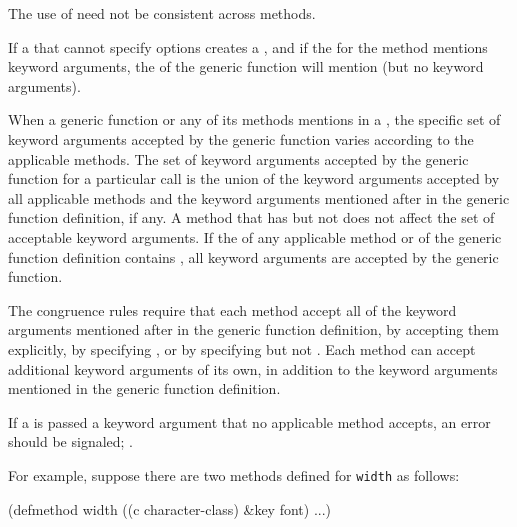  The use of  need not be consistent across methods.

If a  that cannot specify  options
creates a , and if the  for the method
mentions keyword arguments, the  of the generic function
will mention  (but no keyword arguments).

\endlist

\endSubsection%


                                                        
When a generic function or any of its methods mentions 
 in a , the specific set of keyword
arguments accepted by the generic function varies according to the
applicable methods.  The set of keyword arguments accepted by the
generic function for a particular call is the union of the keyword
arguments accepted by all applicable methods and the keyword arguments
mentioned after  in the generic function definition,
if any.  A method that has  but not  does not affect the
set of acceptable keyword arguments.  If
the  of any applicable method or of the generic
function definition contains , all
keyword arguments are accepted by the generic function.

The  congruence rules require that each method
accept all of the keyword arguments mentioned after  in the
generic function definition, by accepting them explicitly, by
specifying , or by specifying  but
not .  Each method can accept additional keyword arguments
of its own, in addition to the keyword arguments mentioned in the
generic function definition.

If a  is passed a keyword argument that no applicable
method accepts, an error should be signaled; \seesection\FuncallErrorChecking.


For example, suppose there are two methods defined for {\tt width}
as follows:

\code
 (defmethod width ((c character-class) &key font) ...)
 
